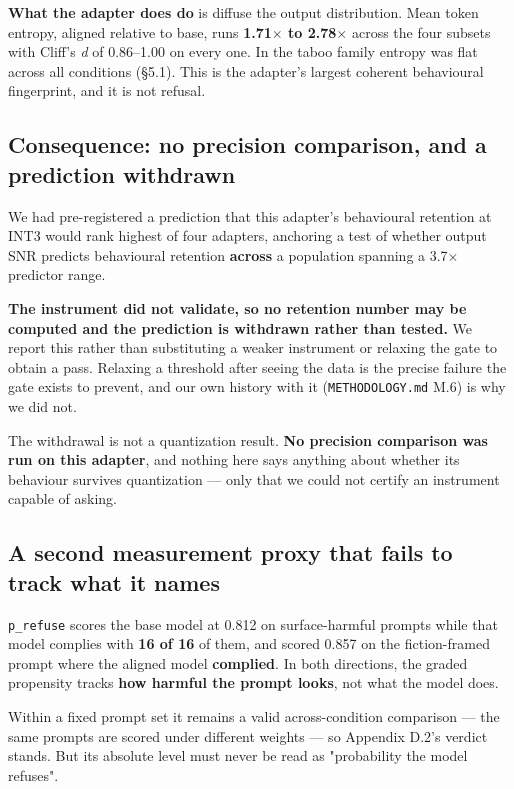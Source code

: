 \textbf{What the adapter does do} is diffuse the output distribution. Mean token entropy, aligned relative to base, runs \textbf{1.71$\times$ to 2.78$\times$} across the four subsets with Cliff's \emph{d} of 0.86--1.00 on every one. In the taboo family entropy was flat across all conditions (\S{}5.1). This is the adapter's largest coherent behavioural fingerprint, and it is not refusal.

\subsection{Consequence: no precision comparison, and a prediction withdrawn}

We had pre-registered a prediction that this adapter's behavioural retention at INT3 would rank highest of four adapters, anchoring a test of whether output SNR predicts behavioural retention \textbf{across} a population spanning a 3.7$\times$ predictor range.

\textbf{The instrument did not validate, so no retention number may be computed and the prediction is withdrawn rather than tested.} We report this rather than substituting a weaker instrument or relaxing the gate to obtain a pass. Relaxing a threshold after seeing the data is the precise failure the gate exists to prevent, and our own history with it (\texttt{METHODOLOGY.\allowbreak{}md} M.6) is why we did not.

The withdrawal is not a quantization result. \textbf{No precision comparison was run on this adapter}, and nothing here says anything about whether its behaviour survives quantization --- only that we could not certify an instrument capable of asking.

\subsection{A second measurement proxy that fails to track what it names}

\texttt{p\_\allowbreak{}refuse} scores the base model at 0.812 on surface-harmful prompts while that model complies with \textbf{16 of 16} of them, and scored 0.857 on the fiction-framed prompt where the aligned model \textbf{complied}. In both directions, the graded propensity tracks \textbf{how harmful the prompt looks}, not what the model does.

Within a fixed prompt set it remains a valid across-condition comparison --- the same prompts are scored under different weights --- so Appendix D.2's verdict stands. But its absolute level must never be read as "probability the model refuses".

